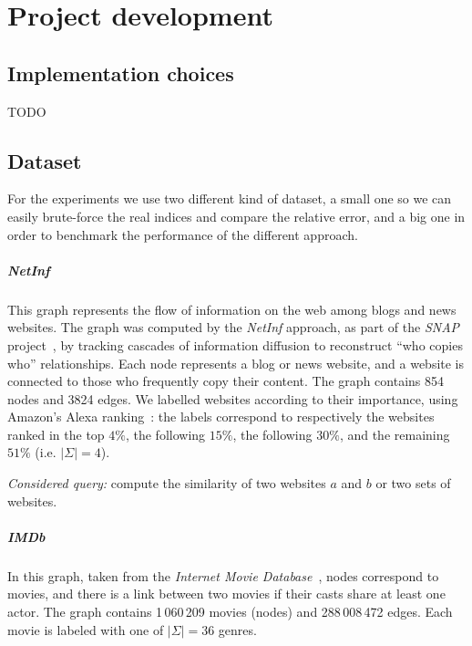 
\chapter{Project development}
    
    \section{Implementation choices}
    
    TODO 
    
    \section{Dataset}
    
    For the experiments we use two different kind of dataset, a small one so we can easily brute-force the real indices and compare the relative error, and a big one in order to benchmark the performance of the different approach.
    
    \paragraph*{NetInf} This graph represents the flow of information on the web among blogs and news websites. The graph was computed by the \textit{NetInf} approach, as part of the \textit{SNAP} project~\cite{netinf}, by tracking cascades of information diffusion to reconstruct ``who copies who'' relationships. Each node represents a blog or news website, and a website is connected to those who frequently copy their content. The graph contains 854 nodes and 3824 edges. We labelled websites according to their importance, using Amazon's Alexa ranking~\cite{alexarank}: the labels correspond to respectively the websites ranked in the top $4\%$, the following $15\%$, the following $30\%$, and the remaining $51\%$ (i.e. $|\Sigma|=4$). 
    
    \textsl{Considered query:} compute the similarity of two websites $a$ and $b$ or two sets of websites.
    
    \paragraph*{IMDb} In this graph, taken from the \textit{Internet Movie Database}~\cite{imdb}, nodes correspond to movies, and there is a link between two movies if their casts share at least one actor. The graph contains 1\,060\,209 movies (nodes) and 288\,008\,472 edges. Each movie is labeled with one of $|\Sigma|=36$ genres. 
    
